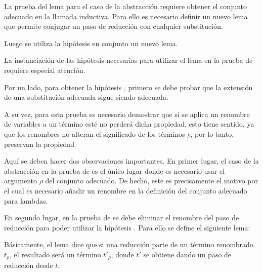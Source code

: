 \documentclass[]{report}
\begin{document}
	La prueba del lema para el caso de la abstracción requiere obtener el conjunto adecuado  \AgdaSpace{}%
	\AgdaSpace{}%
	\AgdaSpace{}%
	\AgdaSpace{}%
	en la llamada inductiva.
	Para ello es necesario definir un nuevo lema que permite conjugar un paso de reducción con cualquier substitución.
	
	
	Luego se utiliza la hipótesis  en conjunto un nuevo lema.
	
	
	La instanciación de las hipótesis necesarias para utilizar el lema en la prueba de  requiere especial atención.
	
	Por un lado, para obtener la hipótesis \snstar {}, primero se debe probar que la extensión de una substitución adecuada sigue siendo adecuada.
	
	
	A su vez, para esta prueba es necesario demostrar que si se aplica un renombre de variables a un término \snstar esté no perderá dicha propiedad, esto tiene sentido, ya que los renombres no alteran el significado de los términos y, por lo tanto, preservan la propiedad \snstar
	
	
	Aquí se deben hacer dos observaciones importantes.
	En primer lugar, el caso de la abstracción en la prueba de  es el único lugar donde es necesario usar el argumento $\rho$ del conjunto adecuado.
	De hecho, este es precisamente el motivo por el cual es necesario añadir un renombre en la definición del conjunto adecuado para lambdas.
	
	En segundo lugar, en la prueba de  se debe eliminar el renombre del paso de reducción para poder utilizar la hipótesis .
	Para ello se define el siguiente lema:
	
	
	Básicamente, el lema dice que si una reducción parte de un término renombrado $t_\rho$, el resultado será un término $t'_\rho$, donde $t'$ se obtiene dando un paso de reducción desde $t$.
	
\end{document}
